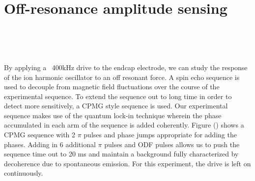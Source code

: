 \documentclass[aps,prl,twocolumn,groupedaddress]{revtex4-1}
\begin{document}
\section{Off-resonance amplitude sensing}

\begin{figure}
\centering
  \\
  \\
  \hfill
  \\
  \caption{}\label{fig:2}
\end{figure}

By applying a ~400kHz drive to the endcap electrode, we can study the response of the ion harmonic oscillator to an off resonant force. A spin echo sequence is used to decouple from magnetic field fluctuations over the course of the experimental sequence. To extend the sequence out to long time in order to detect more sensitively, a CPMG style sequence is used. Our experimental sequence makes use of the quantum lock-in technique wherein the phase accumulated in each arm of the sequence is added coherently. Figure () shows a CPMG sequence with 2 $\pi$ pulses and phase jumps appropriate for adding the phases. Adding in 6 additional $\pi$ pulses and ODF pulses allows us to push the sequence time out to 20 ms and maintain a background fully characterized by decoherence due to spontaneous emission. For this experiment, the drive is left on continuously.
\end{document}
